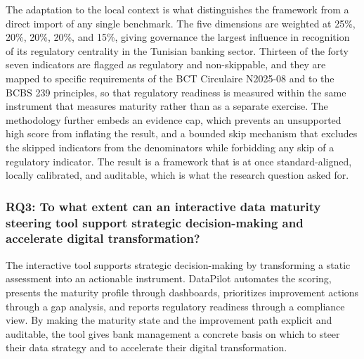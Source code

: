 The adaptation to the local context is what distinguishes the framework from a direct import of any single benchmark. The five dimensions are weighted at 25\%, 20\%, 20\%, 20\%, and 15\%, giving governance the largest influence in recognition of its regulatory centrality in the Tunisian banking sector. Thirteen of the forty seven indicators are flagged as regulatory and non-skippable, and they are mapped to specific requirements of the BCT Circulaire N\textdegree{}2025-08 and to the BCBS 239 principles, so that regulatory readiness is measured within the same instrument that measures maturity rather than as a separate exercise. The methodology further embeds an evidence cap, which prevents an unsupported high score from inflating the result, and a bounded skip mechanism that excludes the skipped indicators from the denominators while forbidding any skip of a regulatory indicator. The result is a framework that is at once standard-aligned, locally calibrated, and auditable, which is what the research question asked for.

\subsubsection{RQ3: To what extent can an interactive data maturity steering tool support strategic decision-making and accelerate digital transformation?}

The interactive tool supports strategic decision-making by transforming a static assessment into an actionable instrument. DataPilot automates the scoring, presents the maturity profile through dashboards, prioritizes improvement actions through a gap analysis, and reports regulatory readiness through a compliance view. By making the maturity state and the improvement path explicit and auditable, the tool gives bank management a concrete basis on which to steer their data strategy and to accelerate their digital transformation.

